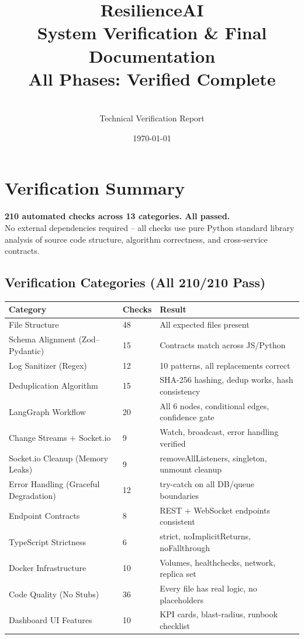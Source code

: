 \documentclass[11pt,a4paper]{article}
\title{{\Huge \textbf{ResilienceAI}}\\[0.3cm]{\Large System Verification \& Final Documentation}\\[0.5cm]{\large \textcolor{primary}{\textbf{All Phases: Verified Complete}}}}
\author{\\Technical Verification Report}
\date{\today}
\begin{document}
\maketitle
\thispagestyle{empty}

\section{Verification Summary}

\begin{verifybox}
\textbf{210 automated checks across 13 categories. All passed.}\\
No external dependencies required -- all checks use pure Python standard library
analysis of source code structure, algorithm correctness, and cross-service contracts.
\end{verifybox}

\subsection{Verification Categories (All 210/210 Pass)}

\begin{center}
\begin{tabular}{p{5cm} p{3cm} p{5cm}}
\toprule
\textbf{Category} & \textbf{Checks} & \textbf{Result} \\
\midrule
File Structure & 48 & All expected files present \\
Schema Alignment (Zod--Pydantic) & 15 & Contracts match across JS/Python \\
Log Sanitizer (Regex) & 12 & 10 patterns, all replacements correct \\
Deduplication Algorithm & 15 & SHA-256 hashing, dedup works, hash consistency \\
LangGraph Workflow & 20 & All 6 nodes, conditional edges, confidence gate \\
Change Streams + Socket.io & 9 & Watch, broadcast, error handling verified \\
Socket.io Cleanup (Memory Leaks) & 9 & removeAllListeners, singleton, unmount cleanup \\
Error Handling (Graceful Degradation) & 12 & try-catch on all DB/queue boundaries \\
Endpoint Contracts & 8 & REST + WebSocket endpoints consistent \\
TypeScript Strictness & 6 & strict, noImplicitReturns, noFallthrough \\
Docker Infrastructure & 10 & Volumes, healthchecks, network, replica set \\
Code Quality (No Stubs) & 36 & Every file has real logic, no placeholders \\
Dashboard UI Features & 10 & KPI cards, blast-radius, runbook checklist \\
\bottomrule
\end{tabular}
\end{center}
\end{document}
